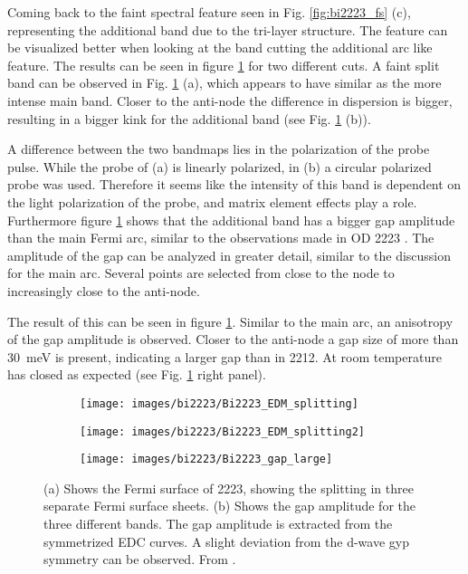 Coming back to the faint spectral feature seen in Fig. \ref{fig:bi2223_fs} (c), representing the additional band due to the tri-layer structure.
The feature can be visualized better when looking at the band cutting the additional arc like feature.
The results can be seen in figure \ref{fig:trilayer_splitting} for two different cuts.
A faint split band can be observed in Fig. \ref{fig:trilayer_splitting} (a), which appears to have similar as the more intense main band.
Closer to the anti-node the difference in dispersion is bigger, resulting in a bigger kink for the additional band (see Fig. \ref{fig:trilayer_splitting} (b)).

A difference between the two bandmaps lies in the polarization of the probe pulse.
While the probe of (a) is linearly polarized, in (b) a circular polarized probe was used.
Therefore it seems like the intensity of this band is dependent on the light polarization of the probe, and matrix element effects play a role.
Furthermore figure \ref{fig:trilayer_splitting} shows that the additional band has a bigger gap amplitude than the main Fermi arc, similar to the observations made in OD 2223 \cite{luo_electronic_2023}.
The amplitude of the gap can be analyzed in greater detail, similar to the discussion for the main arc.
Several points are selected from close to the node to increasingly close to the anti-node.

The result of this can be seen in figure \ref{fig:trilayer_splitting}.
Similar to the main arc, an anisotropy of the gap amplitude is observed.
Closer to the anti-node a gap size of more than \qty{30}{\milli\electronvolt} is present, indicating a larger gap than in 2212.
At room temperature has closed as expected (see Fig. \ref{fig:trilayer_splitting} right panel).

\begin{figure}
	\centering
	\begin{subfigure}[b]{0.3\textwidth}
		\texttt{[image: images/bi2223/Bi2223\_EDM\_splitting]}
		\caption{}
	\end{subfigure}
	\begin{subfigure}[b]{0.3\textwidth}
		\texttt{[image: images/bi2223/Bi2223\_EDM\_splitting2]}
		\caption{}
	\end{subfigure}
	\begin{subfigure}[b]{0.39\textwidth}
		\texttt{[image: images/bi2223/Bi2223\_gap\_large]}
		\caption{}
	\end{subfigure}
	\caption{(a) Shows the Fermi surface of 2223, showing the splitting in three separate Fermi surface sheets. (b) Shows the gap amplitude for the three different bands. The gap amplitude is extracted from the symmetrized EDC curves. A slight deviation from the d-wave gyp symmetry can be observed. From \cite{luo_electronic_2023}.}
	\label{fig:trilayer_splitting}
\end{figure}

